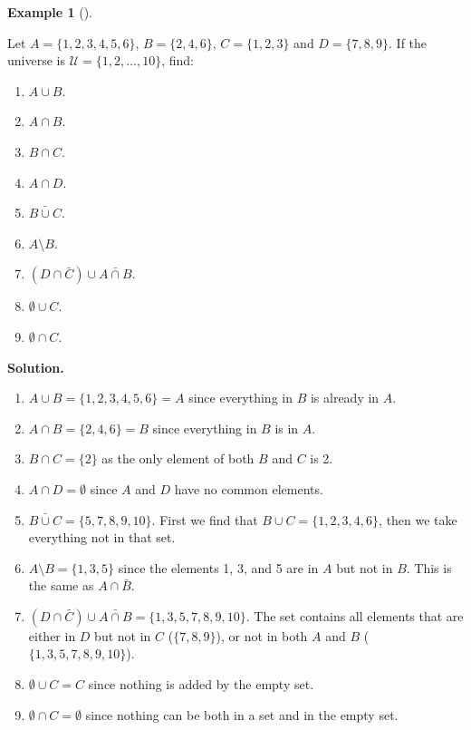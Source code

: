 \documentclass[10pt,]{book}
\theoremstyle{plain}
\theoremstyle{definition}
\newtheorem{example}[theorem]{Example}
\theoremstyle{definition}
\theoremstyle{definition}
\numberwithin{equation}{section}
\def\U{\mathcal U}
\begin{document}
\begin{example}[]\label{example-5}

          Let \(A = \{1, 2, 3, 4, 5, 6\}\), \(B = \{2, 4, 6\}\), \(C = \{1, 2, 3\}\) and \(D = \{7, 8, 9\}\). If the universe is \(\U = \{1, 2, \ldots, 10\}\), find:
\leavevmode%
\begin{enumerate}
\item\hypertarget{li-48}{}\(A \cup B\).\item\hypertarget{li-49}{}\(A \cap B\).\item\hypertarget{li-50}{}\(B \cap C\).\item\hypertarget{li-51}{}\(A \cap D\).\item\hypertarget{li-52}{}\(\bar{B \cup C}\).\item\hypertarget{li-53}{}\(A \setminus B\).\item\hypertarget{li-54}{}\((D \cap \bar C) \cup \bar{A \cap B}\).\item\hypertarget{li-55}{}\(\emptyset \cup C\).\item\hypertarget{li-56}{}\(\emptyset \cap C\).\end{enumerate}
\par\medskip\noindent%
\textbf{Solution.}\quad \leavevmode%
\begin{enumerate}
\item\hypertarget{li-57}{}\(A \cup B = \{1, 2, 3, 4, 5, 6\} = A\) since everything in \(B\) is already in \(A\).\item\hypertarget{li-58}{}\(A \cap B = \{2, 4, 6\} = B\) since everything in \(B\) is in \(A\).\item\hypertarget{li-59}{}\(B \cap C = \{2\}\) as the only element of both \(B\) and \(C\) is 2.\item\hypertarget{li-60}{}\(A \cap D = \emptyset\) since \(A\) and \(D\) have no common elements.\item\hypertarget{li-61}{}\(\bar{B \cup C} = \{5, 7, 8, 9, 10\}\). First we find that \(B \cup C = \{1, 2, 3, 4, 6\}\), then we take everything not in that set.\item\hypertarget{li-62}{}\(A \setminus B = \{1, 3, 5\}\) since the elements 1, 3, and 5 are in \(A\) but not in \(B\). This is the same as \(A \cap \bar B\).\item\hypertarget{li-63}{}\((D \cap \bar C) \cup \bar{A \cap B} = \{1, 3, 5, 7, 8, 9, 10\}.\) The set contains all elements that are either in \(D\) but not in \(C\) (\(\{7,8,9\}\)), or not in both \(A\) and \(B\) (\(\{1,3,5,7,8,9,10\}\)).\item\hypertarget{li-64}{}\(\emptyset \cup C = C\) since nothing is added by the empty set.\item\hypertarget{li-65}{}\(\emptyset \cap C = \emptyset\) since nothing can be both in a set and in the empty set.\end{enumerate}
\end{example}
\par
\end{document}
